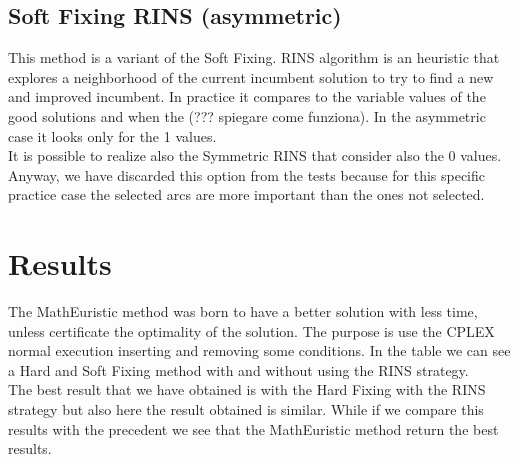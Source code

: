 \subsection{Soft Fixing RINS (asymmetric)}
This method is a variant of the Soft Fixing. RINS algorithm is an heuristic that explores a neighborhood of the current incumbent solution to try to find a new and improved incumbent. In practice it compares to the variable values of the good solutions and when the (??? spiegare come funziona). In the asymmetric case it looks only for the 1 values. \\
It is possible to realize also the Symmetric RINS that consider also the $0$ values. Anyway, we have discarded this option from the tests because for this specific practice case the selected arcs are more important than the ones not selected.
\section{Results}
The MathEuristic method was born to have a better solution with less time, unless certificate the optimality of the solution. The purpose is use the \textsc{CPLEX} normal execution inserting and removing some conditions. In the table we can see a Hard and Soft Fixing method with and without using the RINS strategy.\\
The best result that we have obtained is with the Hard Fixing with the RINS strategy but also here the result obtained is similar. While if we compare this results with the precedent we see that the MathEuristic method return the best results.\\


